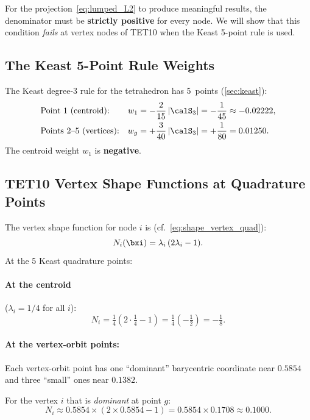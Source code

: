 For the projection~\eqref{eq:lumped_L2} to produce meaningful results, the
denominator must be \textbf{strictly positive} for every node.  We will show
that this condition \emph{fails} at vertex nodes of TET10 when the Keast
5-point rule is used.


\subsection{The Keast 5-Point Rule Weights}

The Keast degree-3 rule for the tetrahedron has 5~points
(\cref{sec:keast}):
\begin{equation}
  \begin{aligned}
    &\text{Point 1 (centroid):}   & w_1 &= -\frac{2}{15}\,|\calS_3|
      = -\frac{1}{45} \approx -0.02222, \\
    &\text{Points 2--5 (vertices):} & w_g &= +\frac{3}{40}\,|\calS_3|
      = +\frac{1}{80} = 0.01250.
  \end{aligned}
  \label{eq:keast5_detail}
\end{equation}
The centroid weight $w_1$ is \textbf{negative}.


\subsection{TET10 Vertex Shape Functions at Quadrature Points}

The vertex shape function for node $i$ is (cf.\
\cref{eq:shape_vertex_quad}):
\[
  N_i(\bxi) = \lambda_i\,(2\lambda_i - 1).
\]
At the 5 Keast quadrature points:

\paragraph{At the centroid} ($\lambda_i = 1/4$ for all $i$):
\[
  N_i = \tfrac{1}{4}(2 \cdot \tfrac{1}{4} - 1) = \tfrac{1}{4}(-\tfrac{1}{2})
      = -\tfrac{1}{8}.
\]

\paragraph{At the vertex-orbit points:} Each vertex-orbit point has one
``dominant'' barycentric coordinate near $0.5854$ and three ``small'' ones near
$0.1382$.

For the vertex $i$ that is \emph{dominant} at point $g$:
\[
  N_i \approx 0.5854 \times (2 \times 0.5854 - 1) = 0.5854 \times 0.1708
      \approx 0.1000.
\]

